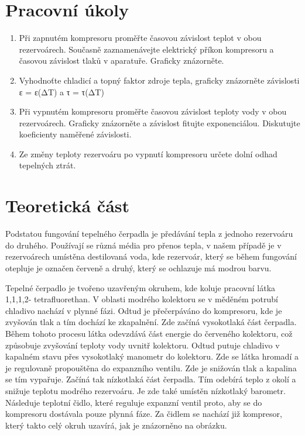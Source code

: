 \section{Pracovní úkoly}

\begin{enumerate}
\item Při zapnutém kompresoru proměřte časovou závislost teplot v obou rezervoárech. Současně zaznamenávejte elektrický příkon kompresoru a časovou závislost tlaků v aparatuře. Graficky znázorněte.

\item Vyhodnoťte chladicí a topný faktor zdroje tepla, graficky znázorněte závislosti ε = ε(ΔT) a τ = τ(ΔT)

\item Při vypnutém kompresoru proměřte časovou závislost teploty vody v obou rezervoárech. Graficky znázorněte a závislost fitujte exponenciálou. Diskutujte koeficienty naměřené závislosti.

\item Ze změny teploty rezervoáru po vypnutí kompresoru určete dolní odhad tepelných ztrát.

\end{enumerate}

\section{Teoretická část}

Podstatou fungování tepelného čerpadla je předávání tepla z jednoho rezervoáru do druhého. Používají se různá média pro přenos tepla, v našem případě je v rezervoárech umístěna destilovaná voda, kde rezervoár, který se během fungování otepluje je označen červeně a druhý, který se ochlazuje má modrou barvu.

Tepelné čerpadlo je tvořeno uzavřeným okruhem, kde koluje pracovní látka 1,1,1,2-
tetrafluorethan. V oblasti modrého kolektoru se v měděném potrubí chladivo nachází v plynné fázi. Odtud je přečerpáváno do kompresoru, kde je zvyšován tlak a tím dochází ke zkapalnění. Zde začíná vysokotlaká část čerpadla. Během tohoto procesu látka odevzdává část energie do červeného kolektoru, což způsobuje zvyšování teploty vody uvnitř kolektoru. Odtud putuje chladivo v kapalném stavu přes vysokotlaký manometr do kolektoru. Zde se látka hromadí a je regulovaně propouštěna do expanzního ventilu. Zde je snižován tlak a kapalina se tím vypařuje. Začíná tak nízkotlaká část čerpadla. Tím odebírá teplo z okolí a snižuje teplotu modrého rezervoáru. Je zde také umístěn nízkotlaký barometr. Následuje teplotní čidlo, které reguluje expanzní ventil proto, aby se do kompresoru dostávala pouze plynná fáze. Za čidlem se nachází již kompresor, který takto celý okruh uzavírá, jak je znázorněno na obrázku.



